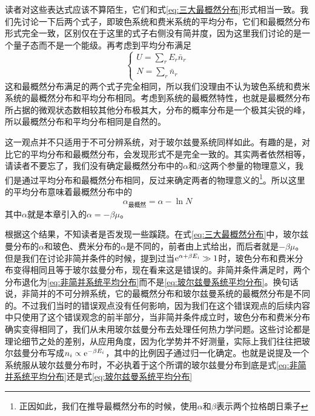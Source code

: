 \documentclass[../../main.tex]{subfiles}
\begin{document}
读者对这些表达式应该不算陌生，它们和式\eqref{eq:三大最概然分布}形式相当一致。我们先讨论一下后两个式子，即玻色系统和费米系统的平均分布，它们和最概然分布形式完全一致，区别仅在于这里的式子右侧没有简并度，因为这里我们讨论的是一个量子态而不是一个能级。再考虑到平均分布满足
\begin{equation}
    \begin{cases}
        U=\sum_rE_r\bar{n}_r \\
        N=\sum_r\bar{n}_r
    \end{cases}
\end{equation}
这和最概然分布满足的两个式子完全相同，所以我们没理由不认为玻色系统和费米系统的最概然分布和平均分布相同。考虑到系统的最概然特性，也就是最概然分布所占据的微观状态数相较其他分布极其大，分布的概率分布是一个极其尖锐的峰，所以最概然分布和平均分布相同是自然的。

这一观点并不只适用于不可分辨系统，对于玻尔兹曼系统同样如此。有趣的是，对比它的平均分布和最概然分布，会发现形式不是完全一致的。其实两者依然相等，请读者不要忘了，我们没有确定最概然分布中的\(\alpha\)和\(\beta\)这两个参量的物理意义，我们是通过平均分布和最概然分布相同，反过来确定两者的物理意义的\footnote{正因如此，我们在推导最概然分布的时候，使用\(\alpha\)和\(\beta\)表示两个拉格朗日乘子}。所以这里的平均分布意味着最概然分布中的
\begin{equation}
    \alpha_{\text{最概然}}=\alpha-\ln N
\end{equation}
其中\(\alpha\)就是本章引入的\(\alpha=-\beta\mu\)。

根据这个结果，不知读者是否发现一些蹊跷。在式\eqref{eq:三大最概然分布}中，玻尔兹曼分布的\(\alpha\)和玻色、费米分布的\(\alpha\)是不同的，前者由上式给出，而后者就是\(-\beta\mu\)。但是我们在讨论非简并条件的时候，提到过当\(\mathrm{e}^{\alpha+\beta E_i}\gg1\)时，玻色分布和费米分布变得相同且等于玻尔兹曼分布，现在看来这是错误的。非简并条件满足时，两个分布退化为\eqref{eq:非简并系统平均分布}而不是\eqref{eq:玻尔兹曼系统平均分布}。换句话说，非简并的不可分辨系统，它的最概然分布和玻尔兹曼系统的最概然分布是不同的。不过我们当时的错误观点没有任何影响，因为我们在这个错误观点的后续内容中只使用了这个错误观念的前半部分，当非简并条件成立时，玻色分布和费米分布确实变得相同了，我们从未用玻尔兹曼分布去处理任何热力学问题。这些讨论都是理论细节之处的差别，从应用角度，因为化学势并不好测量，实际上我们往往把玻尔兹曼分布写成\(n_i\propto\mathrm{e}^{-\beta E_i}\)，其中的比例因子通过归一化确定。也就是说提及一个系统服从玻尔兹曼分布时，不必执着于这个所谓的玻尔兹曼分布到底是式\eqref{eq:非简并系统平均分布}还是式\eqref{eq:玻尔兹曼系统平均分布}
\end{document}
